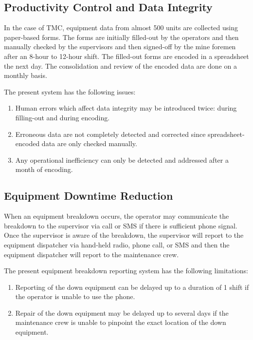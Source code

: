 \documentclass[12pt]{report}
\begin{document}
\subsection{Productivity Control and Data Integrity}

In the case of TMC, equipment data from almost 500 units are collected using paper-based forms.
The forms are initially filled-out by the operators and then manually checked by the supervisors and then signed-off by the mine foremen after an 8-hour to 12-hour shift.
The filled-out forms are encoded in a spreadsheet the next day.
The consolidation and review of the encoded data are done on a monthly basis.

The present system has the following issues:

\begin{enumerate}
\item Human errors which affect data integrity may be introduced twice: during filling-out and during encoding.
\item Erroneous data are not completely detected and corrected since spreadsheet-encoded data are only checked manually.
\item Any operational inefficiency can only be detected and addressed after a month of encoding.
\end{enumerate}

\subsection{Equipment Downtime Reduction}

When an equipment breakdown occurs, the operator may communicate the breakdown to the supervisor via call or SMS if there is sufficient phone signal.
Once the supervisor is aware of the breakdown, the supervisor will report to the equipment dispatcher via hand-held radio, phone call, or SMS and then the equipment dispatcher will report to the maintenance crew.

The present equipment breakdown reporting system has the following limitations:

\begin{enumerate}
\item Reporting of the down equipment can be delayed up to a duration of 1 shift if the operator is unable to use the phone.
\item Repair of the down equipment may be delayed up to several days if the maintenance crew is unable to pinpoint the exact location of the down equipment.
\end{enumerate}
\end{document}
